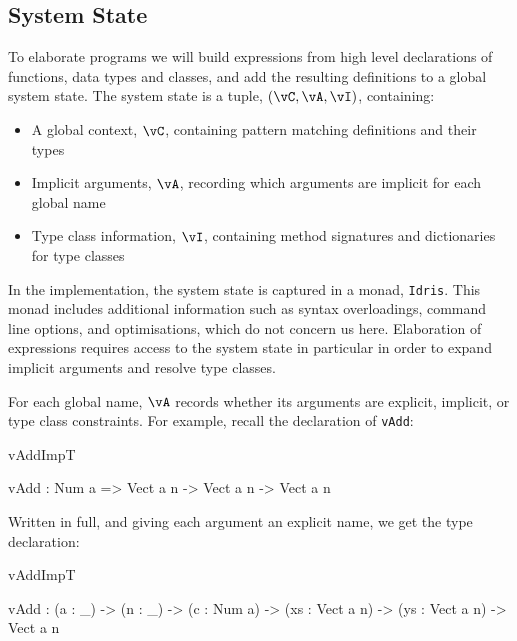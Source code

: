 


\subsection{System State}

\label{sect:sysstate}

To elaborate \Idris{} programs we will build expressions from high level
declarations of functions, data types and classes, and add the resulting
definitions to a global system state.
The system state is a tuple, $(\vC,\vA,\vI)$, containing:

\begin{itemize}
\item A global context, $\vC$, containing pattern matching definitions and their types
\item Implicit arguments, $\vA$, recording which arguments are implicit for each global name
\item Type class information, $\vI$, containing method signatures and dictionaries for type classes
\end{itemize}

In the implementation, the system state is captured in a monad, \texttt{Idris}.
This monad includes additional information such as syntax overloadings,
command line options, and optimisations, which do not concern us here. Elaboration
of expressions requires access to the system state in particular in order to expand
implicit arguments and resolve type classes. 

For each global name, $\vA$ records whether its arguments are explicit, implicit,
or type class constraints.  For example, recall the declaration
of \texttt{vAdd}:

\begin{SaveVerbatim}{vAddImpT}

vAdd : Num a => Vect a n -> Vect a n -> Vect a n

\end{SaveVerbatim}

\noindent
Written in full, and giving each argument an explicit name, we get the
type declaration:

\begin{SaveVerbatim}{vAddImpT}

vAdd : (a : _) -> (n : _) -> (c : Num a) -> 
       (xs : Vect a n) -> (ys : Vect a n) -> Vect a n

\end{SaveVerbatim}


